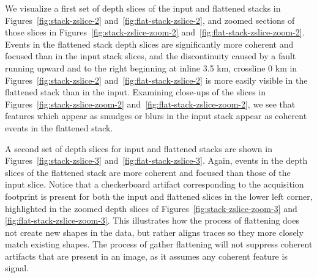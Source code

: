 


We visualize a first set of depth slices of the input and flattened stacks in Figures~\ref{fig:stack-zslice-2} and~\ref{fig:flat-stack-zslice-2}, and zoomed sections of those slices in Figures~\ref{fig:stack-zslice-zoom-2} and~\ref{fig:flat-stack-zslice-zoom-2}.  Events in the flattened stack depth slices are significantly more coherent and focused than in the input stack slices, and the discontinuity caused by a fault running upward and to the right beginning at inline 3.5 km, crossline 0 km in Figures~\ref{fig:stack-zslice-2} and~\ref{fig:flat-stack-zslice-2} is more easily visible in the flattened stack than in the input.  Examining  close-ups of the slices in  Figures~\ref{fig:stack-zslice-zoom-2} and~\ref{fig:flat-stack-zslice-zoom-2}, we see that features which appear as smudges or blurs in the input stack appear as coherent events in the flattened stack.



A second set of depth slices for input and flattened stacks are shown in Figures~\ref{fig:stack-zslice-3} and~\ref{fig:flat-stack-zslice-3}.  Again, events in the  depth slices of the flattened stack are more coherent and focused than those of the input slice.  Notice that a checkerboard artifact corresponding to the acquisition footprint is present for both the input and flattened slices in the lower left corner, highlighted in the zoomed depth slices of Figures~\ref{fig:stack-zslice-zoom-3} and \ref{fig:flat-stack-zslice-zoom-3}.  This illustrates how the process of flattening does not create new shapes in the data, but rather aligns traces so they more closely match existing shapes.  The process of gather flattening will not suppress coherent artifacts that are present in an image, as it assumes any coherent feature is signal.




